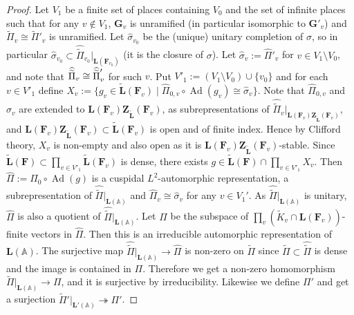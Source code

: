 \documentclass[a4paper]{amsart}
\numberwithin{equation}{section}
\theoremstyle{remark}
\theoremstyle{definition}
\DeclareMathOperator{\Ad}{Ad}
\newcommand{\glob}[1]{\boldsymbol{#1}}
\newcommand{\onto}{\twoheadrightarrow}
\renewcommand{\simeq}{\cong}
\newcommand{\lowprime}[1][\prime]{
  \mathchoice
    {\raisebox{-0.7ex}{$\scriptstyle #1$}}
    {\raisebox{-0.7ex}{$\scriptstyle #1$}}
    {\raisebox{-0.7ex}{$\scriptstyle #1$}}
    {\raisebox{-0.3ex}{$\scriptscriptstyle #1$}}
}
\begin{document}
\begin{proof}
Let $V_{1}$ be a finite set of places containing $V_{0}$ and the set of infinite places such that for any $v\notin V_{1}$, $\glob{G}_{v}$ is unramified (in particular isomorphic to $\glob{G}'_{v}$) and $\widetilde{\Pi}_{v} \simeq \widetilde{\Pi}'_{v}$ is unramified.
Let $\widehat{\sigma}_{v_{0}}$ be the (unique) unitary completion of $\sigma$, so in particular $\widehat{\sigma}_{v_{0}} \subset \widehat{\widetilde{\Pi}}_{v_0}|_{\glob{L}(\glob{F}_{v_0})}$ (it is the closure of $\sigma$).
Let $\widehat{\sigma}_{v} := \widehat{\Pi}'_{v}$ for $v\in V_{1}\setminus V_{0}$, and note that $\widehat{\widetilde{\Pi}}_v \cong \widehat{\widetilde{\Pi}}^{\lowprime}_v$ for such $v$.
Put $V'_{1} := (V_{1}\setminus V_{0})\cup \{v_{0}\}$ and for each $v\in V'_{1}$ define $X_{v} := \{g_v \in \widetilde{\glob{L}}(\glob{F}_{v})\mid \widehat{\Pi}_{0,v}\circ \Ad(g_v)\simeq \widehat{\sigma}_{v}\}$.
Note that $\widehat{\Pi}_{0,v}$ and $\widehat{\sigma}_{v}$ are extended to $\glob{L}(\glob{F}_{v})\glob{Z}_{\widetilde{\glob{L}}}(\glob{F}_{v})$, as subrepresentations of $\widehat{\widetilde{\Pi}}_{v}|_{\glob{L}(\glob{F}_{v})\glob{Z}_{\widetilde{\glob{L}}}(\glob{F}_{v})}$, and $\glob{L}(\glob{F}_{v})\glob{Z}_{\widetilde{\glob{L}}}(\glob{F}_{v})\subset \widetilde{\glob{L}}(\glob{F}_{v})$ is open and of finite index.
Hence by Clifford theory, $X_{v}$ is non-empty \cite[Proposition 4.1.3]{MR3996349} and also open as it is $\glob{L}(\glob{F}_{v})\glob{Z}_{\widetilde{\glob{L}}}(\glob{F}_{v})$-stable.
Since $\widetilde{\glob{L}}(\glob{F})\subset \prod_{v\in V'_{1}}\widetilde{\glob{L}}(\glob{F}_{v})$ is dense, there exists $g\in \widetilde{\glob{L}}(\glob{F})\cap \prod_{v\in V'_{1}}X_{v}$.
Then $\widehat{\Pi} := \widehat{\Pi}_{0}\circ \Ad(g)$ is a cuspidal $L^{2}$-automorphic representation, a subrepresentation of $\widehat{\widetilde{\Pi}}|_{\glob{L}(\mathbb{A})}$ and $\widehat{\Pi}_{v}\simeq \widehat{\sigma}_{v}$ for any $v\in V_{1}'$.
As $\widehat{\widetilde{\Pi}}|_{\glob{L}(\mathbb{A})}$ is unitary, $\widehat{\Pi}$ is also a quotient of $\widehat{\widetilde{\Pi}}|_{\glob{L}(\mathbb{A})}$.
Let $\Pi$ be the subspace of $\prod_{v}(\widetilde{K}_{v}\cap \glob{L}(\glob{F}_{v}))$-finite vectors in $\widehat{\Pi}$. Then this is an irreducible automorphic representation of $\glob{L}(\mathbb{A})$.
The surjective map $\widehat{\widetilde{\Pi}}|_{\glob{L}(\mathbb{A})} \to \widehat{\Pi}$ is non-zero on $\widetilde{\Pi}$ since $\widetilde{\Pi}\subset \widehat{\widetilde{\Pi}}$ is dense and the image is contained in $\Pi$.
Therefore we get a non-zero homomorphism $\widetilde{\Pi}|_{\glob{L}(\mathbb{A})}\to \Pi$, and it is surjective by irreducibility.
Likewise we define $\Pi'$ and get a surjection $\widetilde{\Pi}'|_{\glob{L}'(\mathbb{A})}\onto \Pi'$.
\end{proof}
\end{document}
